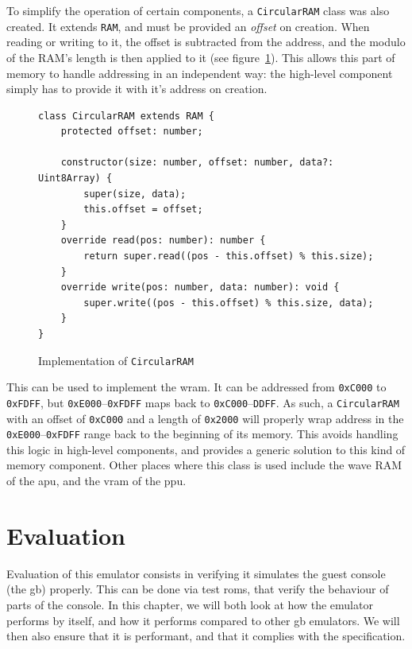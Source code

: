 \documentclass[11pt]{informatics-report}
\begin{document}
To simplify the operation of certain components, a \texttt{CircularRAM} class was also created. It extends \texttt{RAM}, and must be provided an \textit{offset} on creation. When reading or writing to it, the offset is subtracted from the address, and the modulo of the RAM's length is then applied to it (see figure~\ref{fig:circular-ram}). This allows this part of memory to handle addressing in an independent way: the high-level component simply has to provide it with it's address on creation.

\begin{figure}[h]
    \begin{verbatim}
class CircularRAM extends RAM {
    protected offset: number;

    constructor(size: number, offset: number, data?: Uint8Array) {
        super(size, data);
        this.offset = offset;
    }
    override read(pos: number): number {
        return super.read((pos - this.offset) % this.size);
    }
    override write(pos: number, data: number): void {
        super.write((pos - this.offset) % this.size, data);
    }
}
    \end{verbatim}
    \caption{Implementation of \texttt{CircularRAM}}
    \label{fig:circular-ram}
\end{figure}

This can be used to implement the \gls{wram}. It can be addressed from \texttt{0xC000} to \texttt{0xFDFF}, but \texttt{0xE000}--\texttt{0xFDFF} maps back to \texttt{0xC000}--\texttt{DDFF}. As such, a \texttt{CircularRAM} with an offset of \texttt{0xC000} and a length of \texttt{0x2000} will properly wrap address in the \texttt{0xE000}--\texttt{0xFDFF} range back to the beginning of its memory. This avoids handling this logic in high-level components, and provides a generic solution to this kind of memory component. Other places where this class is used include the wave RAM of the \gls{apu}, and the \gls{vram} of the \gls{ppu}.

\chapter{Evaluation}

Evaluation of this emulator consists in verifying it simulates the guest console (the \glsdesc{gb}) properly. This can be done via test \glspl{rom}, that verify the behaviour of parts of the console. In this chapter, we will both look at how the emulator performs by itself, and how it performs compared to other \gls{gb} emulators. We will then also ensure that it is performant, and that it complies with the specification.
\end{document}
